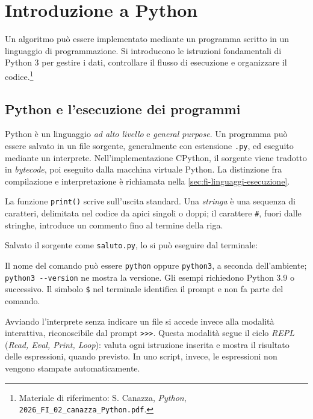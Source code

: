 \chapter{Introduzione a Python}
\label{chap:introduzione-python}

Un algoritmo può essere implementato mediante un programma scritto in un
linguaggio di programmazione. Si introducono le istruzioni fondamentali di
Python 3 per gestire i dati, controllare il flusso di esecuzione e
organizzare il codice.\footnote{Materiale
di riferimento: S. Canazza, \emph{Python},
\nolinkurl{2026_FI_02_canazza_Python.pdf}.}

\section{Python e l'esecuzione dei programmi}
\label{sec:fi-python-esecuzione}

Python è un linguaggio \emph{ad alto livello} e \emph{general purpose}. Un
programma può essere salvato in un file sorgente, generalmente con estensione
\texttt{.py}, ed eseguito mediante un interprete. Nell'implementazione
CPython, il sorgente viene tradotto in \emph{bytecode}, poi eseguito
dalla macchina virtuale Python. La distinzione fra compilazione e
interpretazione è richiamata nella \cref{sec:fi-linguaggi-esecuzione}.

La funzione \texttt{print()} scrive sull'uscita standard. Una \emph{stringa}
è una sequenza di caratteri, delimitata nel codice da apici singoli o doppi;
il carattere \texttt{\#}, fuori dalle stringhe, introduce un commento fino
al termine della riga.



Salvato il sorgente come \texttt{saluto.py}, lo si può eseguire dal
terminale:



Il nome del comando può essere \texttt{python} oppure
\texttt{python3}, a seconda dell'ambiente;
\verb|python3 --version| ne mostra la versione.
Gli esempi richiedono Python 3.9 o successivo.
Il simbolo \texttt{\$} nel terminale identifica il prompt e non fa parte
del comando.

Avviando l'interprete senza indicare un file si accede invece alla modalità
interattiva, riconoscibile dal prompt \lstinline|>>>|. Questa modalità
segue il ciclo \emph{REPL} (\emph{Read, Eval, Print, Loop}): valuta ogni
istruzione inserita e mostra il risultato delle espressioni, quando
previsto. In uno script, invece, le espressioni non vengono stampate
automaticamente.

